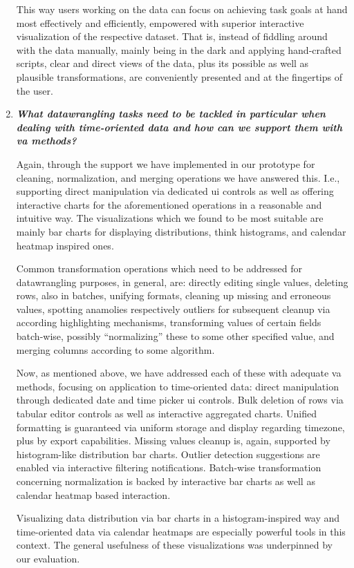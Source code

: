 \begin{enumerate}
  This way users working on the data can focus on achieving task goals at hand most effectively and efficiently, empowered with superior interactive visualization of the respective dataset.
  That is, instead of fiddling around with the data manually, mainly being in the dark and applying hand-crafted scripts, clear and direct views of the data, plus its possible as well as plausible transformations, are conveniently presented and at the fingertips of the user.
  \item \emph{\textbf{What \gls{datawrangling} tasks need to be tackled in particular when dealing with time-oriented data and how can we support them with \gls{va} methods?}}

  Again, through the support we have implemented in our prototype for cleaning, normalization, and merging operations we have answered this.
  I.e., supporting direct manipulation via dedicated \gls{ui} controls as well as offering interactive charts for the aforementioned operations in a reasonable and intuitive way.
  The visualizations which we found to be most suitable are mainly bar charts for displaying distributions, think histograms, and calendar heatmap inspired ones.

  Common transformation operations which need to be addressed for \gls{datawrangling} purposes, in general, are:
  directly editing single values, deleting rows, also in batches, unifying formats, cleaning up missing and erroneous values, spotting anamolies respectively outliers for subsequent cleanup via according highlighting mechanisms, transforming values of certain fields batch-wise, possibly ``normalizing'' these to some other specified value, and merging columns according to some algorithm.

  Now, as mentioned above, we have addressed each of these with adequate \gls{va} methods, focusing on application to time-oriented data:
  direct manipulation through dedicated date and time picker \gls{ui} controls.
  Bulk deletion of rows via tabular editor controls as well as interactive aggregated charts.
  Unified formatting is guaranteed via uniform storage and display regarding timezone, plus by export capabilities.
  Missing values cleanup is, again, supported by histogram-like distribution bar charts.
  Outlier detection suggestions are enabled via interactive filtering notifications.
  Batch-wise transformation concerning normalization is backed by interactive bar charts as well as calendar heatmap based interaction.

  Visualizing data distribution via bar charts in a histogram-inspired way and time-oriented data via calendar heatmaps are especially powerful tools in this context.
  The general usefulness of these visualizations was underpinned by our evaluation.

\end{enumerate}

